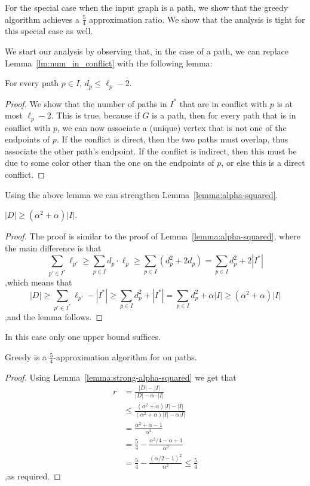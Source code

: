 For the special case when the input graph is a path, 
we show that the greedy algorithm achieves a $\frac{5}{4}$ approximation ratio.
We show that the analysis is tight for this special case as well.

We start our analysis  by observing that, in the case of a path, we can replace
Lemma~\ref{lm:num_in_conflict} with the following lemma:

\begin{lemma}
For every path $p \in I$, $d_p \leq \ell_p - 2$.
\end{lemma}
\begin{proof}
We show that the number of paths in $I^*$ that
are in conflict with $p$ is at most $\ell_p - 2$.  
This is true, because if $G$ is a  path, 
then for every path that is in conflict with $p$, 
we can now associate a (unique) vertex that is not one of the endpoints of $p$.  
If the conflict is direct, then the two paths
must overlap, thus associate the other path's endpoint.  If the
conflict is indirect, then this must be due to some color other than
the one on the endpoints of $p$, or else this is a direct conflict.
{}\end{proof}

Using the above lemma we can strengthen
Lemma~\ref{lemma:alpha-squared}.

\begin{lemma}
\label{lemma:strong-alpha-squared}
$|D| \geq (\alpha^2+\alpha)|I|$.
\end{lemma}
\begin{proof}
The proof is similar to the proof of Lemma~\ref{lemma:alpha-squared},
where the main difference is that
\[
\sum_{p' \in I^*} \ell_{p'}
\geq \sum_{p \in I} d_p \cdot \ell_p
\geq \sum_{p \in I} (d_p^2 + 2d_p)
=    \sum_{p \in I} d_p^2 + 2|I^*|
\]
,which means that 
\[
|D| 
\geq \sum_{p' \in I^*} \ell_{p'} - |I^*|
\geq \sum_{p \in I} d_p^2 + |I^*|
=    \sum_{p \in I} d_p^2 + \alpha |I|
\geq (\alpha^2 + \alpha) |I|
\]
,and the lemma follows.
{}\end{proof}

In this case only one upper bound suffices.

\begin{theorem}
Greedy is a $\frac{5}{4}$-approximation algorithm for
\TWOCR{} on paths.
\end{theorem}
\begin{proof}
Using Lemma~\ref{lemma:strong-alpha-squared} we get that
\begin{align*}
r	& =    
\frac{|D| - |I|}{|D| - \alpha \cdot |I|}
\\&
\leq 
\frac{
	(\alpha^2 + \alpha)|I| - |I|
}{
	(\alpha^2 + \alpha)|I| - \alpha |I|
}
\\&
=    \frac{\alpha^2 + \alpha - 1}{\alpha^2}
\\&
=    \frac{5}{4} - \frac{\alpha^2/4 - \alpha + 1}{\alpha^2}
\\&
=    \frac{5}{4} - \frac{(\alpha/2-1)^2}{\alpha^2}
\leq \frac{5}{4}
\end{align*}
,as required.
{}\end{proof}

